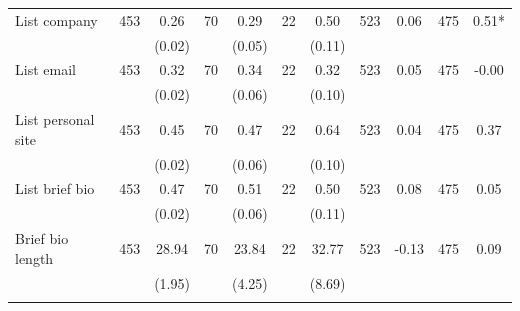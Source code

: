 \begin{tabular}{@{\extracolsep{5pt}}lcccccccccc}
List company   & 453    & 0.26    & 70    & 0.29    & 22    & 0.50    & 523    & 0.06    & 475    & 0.51*   \\
 &   & (0.02)  &   & (0.05)  &   & (0.11)  &   &  &   &  \\ [1ex]
List email   & 453    & 0.32    & 70    & 0.34    & 22    & 0.32    & 523    & 0.05    & 475    & -0.00   \\
 &   & (0.02)  &   & (0.06)  &   & (0.10)  &   &  &   &  \\ [1ex]
List personal site   & 453    & 0.45    & 70    & 0.47    & 22    & 0.64    & 523    & 0.04    & 475    & 0.37   \\
 &   & (0.02)  &   & (0.06)  &   & (0.10)  &   &  &   &  \\ [1ex]
List brief bio   & 453    & 0.47    & 70    & 0.51    & 22    & 0.50    & 523    & 0.08    & 475    & 0.05   \\
 &   & (0.02)  &   & (0.06)  &   & (0.11)  &   &  &   &  \\ [1ex]
Brief bio length   & 453    & 28.94    & 70    & 23.84    & 22    & 32.77    & 523    & -0.13    & 475    & 0.09   \\
 &   & (1.95)  &   & (4.25)  &   & (8.69)  &   &  &   &  \\ [1ex]
\hline \hline \\[-1.8ex]

\end{tabular}
